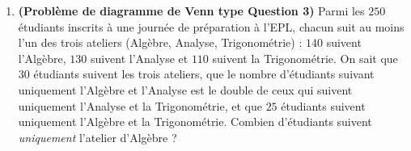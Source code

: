 \begin{enumerate}[label=\textbf{Exercice 8.\arabic* :}, leftmargin=*]
    \item \textbf{(Problème de diagramme de Venn type Question 3)} Parmi les $250$ étudiants inscrits à une journée de préparation à l'EPL, chacun suit au moins l'un des trois ateliers (Algèbre, Analyse, Trigonométrie) : $140$ suivent l'Algèbre, $130$ suivent l'Analyse et $110$ suivent la Trigonométrie. On sait que $30$ étudiants suivent les trois ateliers, que le nombre d'étudiants suivant uniquement l'Algèbre et l'Analyse est le double de ceux qui suivent uniquement l'Analyse et la Trigonométrie, et que $25$ étudiants suivent uniquement l'Algèbre et la Trigonométrie. Combien d'étudiants suivent \emph{uniquement} l'atelier d'Algèbre ?
\end{enumerate}
